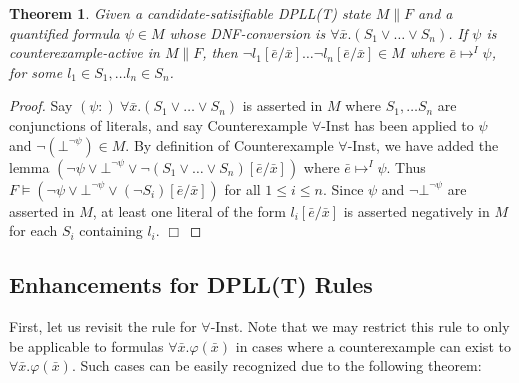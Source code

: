 \documentclass{llncs}
\newtheorem{thm}{Theorem}
\begin{document}
\begin{thm}
\label{thm:cerep}
Given a candidate-satisifiable DPLL(T) state $M \parallel F$ and a quantified formula $\psi \in M$ whose DNF-conversion is $\forall \bar{x}. (S_1 \vee \ldots \vee S_n)$.
If $\psi$ is counterexample-active in $M \parallel F$, then $\neg l_1 [\bar{e}/\bar{x}] \ldots \neg l_n [\bar{e}/\bar{x}] \in M$ where $\bar{e} \mapsto^I \psi$, for some $l_1 \in S_1, \ldots l_n \in S_n$.
\end{thm}
\begin{proof}
Say $(\psi :) \ \forall \bar{x}. (S_1 \vee \ldots \vee S_n)$ is asserted in $M$ where $S_1, \ldots S_n$ are conjunctions of literals, and say Counterexample $\forall$-Inst has been applied to $\psi$ and $\neg (\bot^{\neg \psi}) \in M$.
By definition of Counterexample $\forall$-Inst, we have added the lemma $( \neg \psi \vee \bot^{\neg \psi} \vee \neg (S_1 \vee \ldots \vee S_n )[\bar{e}/\bar{x}] )$ where $\bar{e} \mapsto^I \psi$.
Thus $F \models ( \neg \psi \vee \bot^{\neg \psi} \vee (\neg S_i)[\bar{e}/\bar{x}])$ for all $1 \leq i \leq n$.
Since $\psi$ and $\neg \bot^{\neg \psi}$ are asserted in $M$, at least one literal of the form $l_i[\bar{e}/\bar{x}]$ is asserted negatively in $M$ for each $S_i$ containing $l_i$. $\Box$
\end{proof}

\subsection{Enhancements for DPLL(T) Rules}

First, let us revisit the rule for $\forall$-Inst.
Note that we may restrict this rule to only be applicable to formulas $\forall \bar{x}. \varphi( \bar{ x } )$ in cases where a counterexample can exist to $\forall \bar{x}. \varphi( \bar{ x } )$.
Such cases can be easily recognized due to the following theorem:
\end{document}
